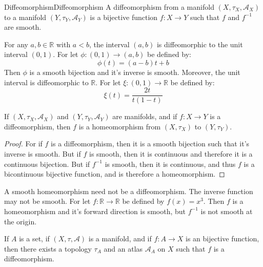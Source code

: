 \documentclass[oneside]{book}                                                  %
\begin{document}
                \begin{fdefinition}{Diffeomorphism}{Diffeomorphism}
                    A diffeomorphism from a manifold $(X,\tau_{X},\mathcal{A}_{X})$
                    to a manifold $(Y,\tau_{Y},\mathcal{A}_{Y})$ is a bijective
                    function $f:X\rightarrow{Y}$ such that $f$ and $f^{\minus{1}}$
                    are smooth.
                \end{fdefinition}
                \begin{lexample}
                    For any $a,b\in\mathbb{R}$ with $a<b$, the interval
                    $(a,b)$ is diffeomorphic to the unit interval $(0,1)$. For
                    let $\phi:(0,1)\rightarrow(a,b)$ be defined by:
                    \begin{equation}
                        \phi(t)=(a-b)t+b
                    \end{equation}
                    Then $\phi$ is a smooth bijection and it's inverse is smooth.
                    Moreover, the unit interval is diffeomorphic to $\mathbb{R}$.
                    For let $\xi:(0,1)\rightarrow\mathbb{R}$ be defined by:
                    \begin{equation}
                        \xi(t)=\frac{2t}{t(1-t)}
                    \end{equation}
                \end{lexample}
                \begin{theorem}
                    If $(X,\tau_{X},\mathcal{A}_{X})$ and
                    $(Y,\tau_{Y},\mathcal{A}_{Y})$ are manifolds, and if
                    $f:X\rightarrow{Y}$ is a diffeomorphism, then $f$ is a
                    homeomorphism from $(X,\tau_{X})$ to $(Y,\tau_{Y})$.
                \end{theorem}
                \begin{proof}
                    For if $f$ is a diffeomorphism, then it is a smooth bijection
                    such that it's inverse is smooth. But if $f$ is smooth, then
                    it is continuous and therefore it is a continuous bijection.
                    But if $f^{\minus{1}}$ is smooth, then it is continuous, and
                    thus $f$ is a bicontinuous bijective function, and is therefore
                    a homeomorphism.
                \end{proof}
                A smooth homeomorphism need not be a diffeomorphism. The inverse
                function may not be smooth. For let
                $f:\mathbb{R}\rightarrow\mathbb{R}$ be defined by $f(x)=x^{3}$.
                Then $f$ is a homeomorphism and it's forward direction is smooth,
                but $f^{\minus{1}}$ is not smooth at the origin.
                \begin{ftheorem}{}{}
                    If $A$ is a set, if $(X,\tau,\mathcal{A})$ is a manifold, and
                    if $f:A\rightarrow{X}$ is an bijective function, then there
                    exists a topology $\tau_{A}$ and an atlas $\mathcal{A}_{A}$
                    on $X$ such that $f$ is a diffeomorphism.
                \end{ftheorem}
\end{document}
